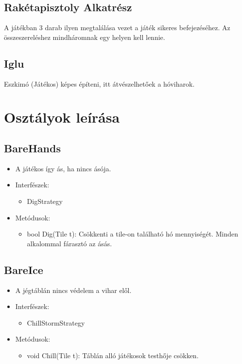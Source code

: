 \subsection{Rakétapisztoly Alkatrész}
A játékban 3 darab ilyen megtalálása vezet a játék sikeres befejezéséhez. Az összeszereléshez mindháromnak egy helyen kell lennie.

\subsection{Iglu}
Eszkimó (Játékos) képes építeni, itt átvészelhetőek a hóviharok.

\section{Osztályok leírása}
\subsection{BareHands}
\begin{itemize}
	\item A játékos így ás, ha nincs ásója.
	\item Interfészek:
	\begin{itemize}
		\item DigStrategy
	\end{itemize}
	\item Metódusok:
	\begin{itemize}
		\item bool Dig(Tile t): Csökkenti a tile-on található hó mennyiségét. Minden alkalommal fárasztó az ásás.
	\end{itemize}
\end{itemize}

\subsection{BareIce}
\begin{itemize}
	\item A jégtáblán nincs védelem a vihar elől.
	\item Interfészek:
	\begin{itemize}
		\item ChillStormStrategy
	\end{itemize}
	\item Metódusok:
	\begin{itemize}
		\item void Chill(Tile t): Táblán alló játékosok testhője csökken.
	\end{itemize}
\end{itemize}

